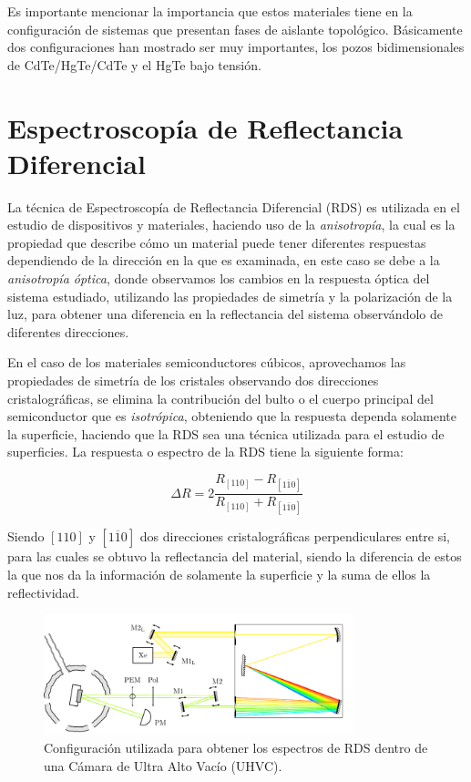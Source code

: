 Es importante mencionar la importancia que estos materiales tiene en la configuración de sistemas que presentan fases de aislante topológico. Básicamente dos configuraciones han mostrado ser muy importantes, los pozos bidimensionales de CdTe/HgTe/CdTe y el HgTe bajo tensión.

\section{Espectroscopía de Reflectancia Diferencial}
\label{sec:chap3-rds}
La técnica de Espectroscopía de Reflectancia Diferencial (RDS) es utilizada en el estudio de dispositivos y materiales, haciendo uso de la \textit{anisotropía}, la cual es la propiedad que describe cómo un material puede tener diferentes respuestas dependiendo de la dirección en la que es examinada, en este caso se debe a la \textit{anisotropía óptica}, donde observamos los cambios en la respuesta óptica del sistema estudiado, utilizando las propiedades de simetría y la polarización de la luz, para obtener una diferencia en la reflectancia del sistema observándolo de diferentes direcciones.

En el caso de los materiales semiconductores cúbicos, aprovechamos las propiedades de simetría de los cristales observando dos direcciones cristalográficas, se elimina la contribución del bulto o el cuerpo principal del semiconductor que es \textit{isotrópica}, obteniendo que la respuesta dependa solamente la superficie, haciendo que la RDS sea una técnica utilizada para el estudio de superficies\cite{Aspnes1985}. La respuesta o espectro de la RDS tiene la siguiente forma:

\begin{equation}
    \label{eqn:ch3-rds-eqn}
    {\Delta R} = 2 \dfrac{R_{[110]}-R_{[1\overline{1}0]}}{R_{[110]}+R_{[1\overline{1}0]}}
\end{equation}

Siendo $[110]$ y $[1\overline{1}0]$ dos direcciones cristalográficas perpendiculares entre si, para las cuales se obtuvo la reflectancia del material, siendo la diferencia de estos la que nos da la información de solamente la superficie y la suma de ellos la reflectividad.

\begin{figure}[h!]
    \centering
    \includegraphics[width=0.8\textwidth]{figures/chap3/RAS-SETUP-gaby.pdf}
        \caption{Configuración utilizada para obtener los espectros de RDS dentro de una Cámara de Ultra Alto Vacío (UHVC)\cite{PdHGaby}.}
    \label{fig:rds-setup}
\end{figure}

